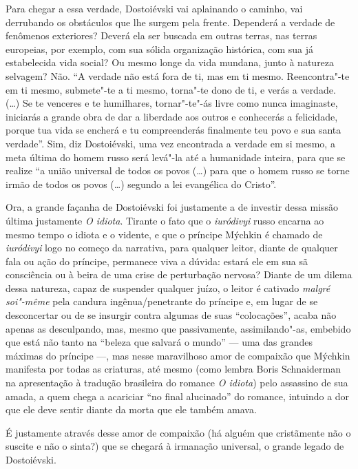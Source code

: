 Para chegar a essa verdade, Dostoiévski vai aplainando o caminho,
vai derrubando os obstáculos que lhe surgem pela frente. Dependerá
a verdade de fenômenos exteriores? Deverá ela ser buscada em
outras terras, nas terras europeias, por exemplo, com sua
sólida organização histórica, com sua já estabelecida vida
social? Ou mesmo longe da vida mundana, junto à natureza
selvagem? Não. ``A verdade não está fora de ti, mas em ti
mesmo. Reencontra"-te em ti mesmo, submete"-te a ti mesmo,
torna"-te dono de ti, e verás a verdade. (\ldots{}) Se te
venceres e te humilhares, tornar"-te"-ás livre como nunca
imaginaste, iniciarás a grande obra de dar a liberdade aos
outros e conhecerás a felicidade, porque tua vida se
encherá e tu compreenderás finalmente teu povo e sua santa
verdade''. Sim, diz Dostoiévski, uma vez encontrada a verdade
em si mesmo, a meta última do homem russo será levá"-la até a
humanidade inteira, para que se realize ``a união universal de
todos os povos (\ldots{}) para que o homem
russo se torne irmão de todos os povos (\ldots{}) segundo a lei
evangélica do Cristo''.

Ora, a grande façanha de Dostoiévski foi justamente a de investir
dessa missão última justamente \emph{O idiota}. Tirante o fato que
o \emph{iuródivyi} russo encarna ao mesmo tempo o idiota e o
vidente, e que o príncipe Mýchkin é chamado de \emph{iuródivyi}
logo no começo da narrativa, para qualquer leitor, diante de
qualquer fala ou ação do príncipe, permanece viva a dúvida:
estará ele em sua sã consciência ou à beira de uma crise de
perturbação nervosa? Diante de um dilema dessa natureza, capaz
de suspender qualquer juízo, o leitor é cativado \emph{malgré
soi"-même} pela candura ingênua/penetrante do príncipe e, em
lugar de se desconcertar ou de se insurgir contra algumas de
suas ``colocações'', acaba não apenas as desculpando, mas,
mesmo que passivamente, assimilando"-as, embebido que está não
tanto na ``beleza que salvará o mundo'' --- uma das grandes
máximas do príncipe ---, mas nesse maravilhoso amor de
compaixão que Mýchkin manifesta por todas as criaturas, até
mesmo (como lembra Boris Schnaiderman na apresentação à
tradução brasileira do romance \emph{O idiota}) pelo
assassino de sua amada, a quem chega a acariciar ``no final
alucinado'' do romance, intuindo a dor que ele deve sentir
diante da morta que ele também amava.

É justamente através desse amor de compaixão (há alguém que cristãmente não o suscite e não o sinta?) que se chegará à irmanação universal, o grande legado de Dostoiévski.

